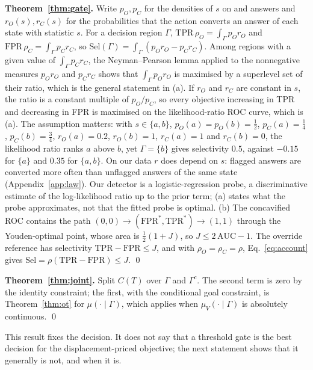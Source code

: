 \textbf{Theorem~\ref{thm:gate}.} Write $p_O,p_C$ for the densities of $s$ on
\ocw{} and \crok{} answers and $r_O(s),r_C(s)$ for the probabilities that the
action converts an answer of each state with statistic $s$. For a decision
region $\Gamma$, $\mathrm{TPR}\,\rho_O=\int_\Gamma p_O r_O$ and
$\mathrm{FPR}\,\rho_C=\int_\Gamma p_C r_C$, so
$\mathrm{Sel}(\Gamma)=\int_\Gamma(p_O r_O-p_C r_C)$. Among regions with a given
value of $\int_\Gamma p_C r_C$, the Neyman--Pearson lemma applied to the
nonnegative measures $p_O r_O$ and $p_C r_C$ shows that
$\int_\Gamma p_O r_O$ is maximised by a superlevel set of their ratio, which is
the general statement in (a). If $r_O$ and $r_C$ are constant in $s$, the ratio
is a constant multiple of $p_O/p_C$, so every objective increasing in TPR and
decreasing in FPR is maximised on the likelihood-ratio ROC curve, which is (a).
The assumption matters: with $s\in\{a,b\}$, $p_O(a)=p_O(b)=\tfrac12$,
$p_C(a)=\tfrac14$, $p_C(b)=\tfrac34$, $r_O(a)=0.2$, $r_O(b)=1$, $r_C(a)=1$ and
$r_C(b)=0$, the likelihood ratio ranks $a$ above $b$, yet $\Gamma=\{b\}$ gives
selectivity $0.5$, against $-0.15$ for $\{a\}$ and $0.35$ for $\{a,b\}$. On
our data $r$ does depend on $s$: flagged answers are converted more often than
unflagged answers of the same state (Appendix~\ref{app:law}). Our detector is a
logistic-regression probe, a discriminative estimate of the log-likelihood
ratio up to the prior term; (a) states what the probe approximates, not that
the fitted probe is optimal. (b) The concavified ROC contains the path
$(0,0)\to(\mathrm{FPR}^*,\mathrm{TPR}^*)\to(1,1)$ through the Youden-optimal
point, whose area is $\tfrac12(1+J)$, so $J\le2\,\mathrm{AUC}-1$. The override
reference has selectivity $\mathrm{TPR}-\mathrm{FPR}\le J$, and with
$\rho_O=\rho_C=\rho$, Eq.~\eqref{eq:account} gives $\mathrm{Sel}=\rho(\mathrm{TPR}-\mathrm{FPR})\le J$. \qed

\textbf{Theorem~\ref{thm:joint}.} Split $C(T)$ over $\Gamma$ and $\Gamma^c$.
The second term is zero by the identity constraint; the first, with the
conditional goal constraint, is Theorem~\ref{thm:ot} for
$\mu(\cdot\mid\Gamma)$, which applies when $\mu_V(\cdot\mid\Gamma)$ is
absolutely continuous. \qed

This result fixes the decision. It does not say that a threshold gate is the
best decision for the displacement-priced objective; the next statement shows
that it generally is not, and when it is.

